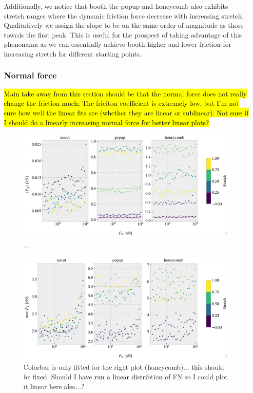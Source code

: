 Additionally, we notice that booth the popup and honeycomb also exhibits stretch ranges where the dynamic friction force decrease with increasing stretch. Qualitatively we assign the slope to be on the same order of magnitude as those towrds the first peak. This is useful for the prospect of taking advantage of this phenonama as we can essentially achieve booth higher and lower friction for increasing stretch for different starting points. 


\subsubsection{Normal force}

\hl{Main take away from this section should be that the normal force does not really change the friction much; The friciton coefficient is extremely low, but I'm not sure how well the linear fits are (whether they are linear or sublinear). Not sure if I should do a linearly increasing normal force for better linear plots?}

\begin{figure}[H]
  \centering
  \includegraphics[width=\linewidth]{figures/baseline/multi_FN_mean_compare.pdf}
  \caption{...}
  \label{fig:}
\end{figure}


\begin{figure}[H]
  \centering
  \includegraphics[width=\linewidth]{figures/baseline/multi_FN_max_compare.pdf}
  \caption{Colorbar is only fitted for the right plot (honeycomb)... this should be fixed. Should I have run a linear distribtion of FN so I could plot it linear here also...?}
  \label{fig:}
\end{figure}



